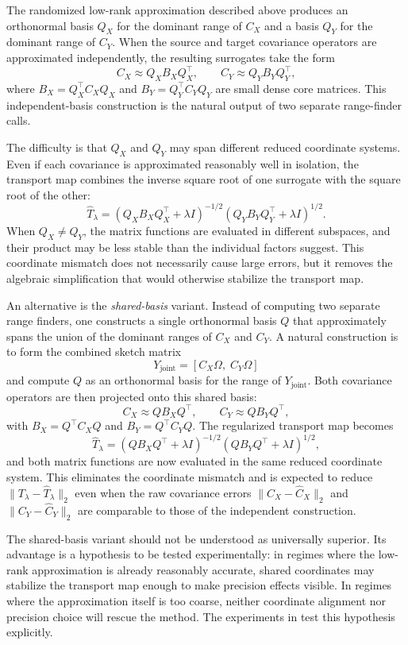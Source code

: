 The randomized low-rank approximation described above produces an orthonormal basis \(Q_X\) for the dominant range of \(C_X\) and a basis \(Q_Y\) for the dominant range of \(C_Y\). When the source and target covariance operators are approximated independently, the resulting surrogates take the form
\[
	C_X \approx Q_X B_X Q_X^\top, \qquad C_Y \approx Q_Y B_Y Q_Y^\top,
\]
where \(B_X = Q_X^\top C_X Q_X\) and \(B_Y = Q_Y^\top C_Y Q_Y\) are small dense core matrices. This independent-basis construction is the natural output of two separate range-finder calls.

The difficulty is that \(Q_X\) and \(Q_Y\) may span different reduced coordinate systems. Even if each covariance is approximated reasonably well in isolation, the transport map combines the inverse square root of one surrogate with the square root of the other:
\[
	\widehat T_\lambda
	=
	(Q_X B_X Q_X^\top + \lambda I)^{-1/2}
	(Q_Y B_Y Q_Y^\top + \lambda I)^{1/2}.
\]
When \(Q_X \neq Q_Y\), the matrix functions are evaluated in different subspaces, and their product may be less stable than the individual factors suggest. This coordinate mismatch does not necessarily cause large errors, but it removes the algebraic simplification that would otherwise stabilize the transport map.

An alternative is the \emph{shared-basis} variant. Instead of computing two separate range finders, one constructs a single orthonormal basis \(Q\) that approximately spans the union of the dominant ranges of \(C_X\) and \(C_Y\). A natural construction is to form the combined sketch matrix
\[
	Y_{\mathrm{joint}} = [C_X\Omega,\; C_Y\Omega]
\]
and compute \(Q\) as an orthonormal basis for the range of \(Y_{\mathrm{joint}}\). Both covariance operators are then projected onto this shared basis:
\[
	C_X \approx Q B_X Q^\top, \qquad C_Y \approx Q B_Y Q^\top,
\]
with \(B_X = Q^\top C_X Q\) and \(B_Y = Q^\top C_Y Q\). The regularized transport map becomes
\[
	\widehat T_\lambda
	=
	(Q B_X Q^\top + \lambda I)^{-1/2}
	(Q B_Y Q^\top + \lambda I)^{1/2},
\]
and both matrix functions are now evaluated in the same reduced coordinate system. This eliminates the coordinate mismatch and is expected to reduce \(\|T_\lambda - \widehat T_\lambda\|_2\) even when the raw covariance errors \(\|C_X - \widehat C_X\|_2\) and \(\|C_Y - \widehat C_Y\|_2\) are comparable to those of the independent construction.

The shared-basis variant should not be understood as universally superior. Its advantage is a hypothesis to be tested experimentally: in regimes where the low-rank approximation is already reasonably accurate, shared coordinates may stabilize the transport map enough to make precision effects visible. In regimes where the approximation itself is too coarse, neither coordinate alignment nor precision choice will rescue the method. The experiments in  test this hypothesis explicitly.

